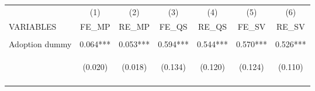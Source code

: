 \begin{center}
\begin{tabular}{lcccccc} \hline
 & (1) & (2) & (3) & (4) & (5) & (6) \\
VARIABLES & FE\_MP & RE\_MP & FE\_QS & RE\_QS & FE\_SV & RE\_SV \\ \hline
\vspace{4pt} & \begin{footnotesize}\end{footnotesize} & \begin{footnotesize}\end{footnotesize} & \begin{footnotesize}\end{footnotesize} & \begin{footnotesize}\end{footnotesize} & \begin{footnotesize}\end{footnotesize} & \begin{footnotesize}\end{footnotesize} \\
Adoption dummy & 0.064*** & 0.053*** & 0.594*** & 0.544*** & 0.570*** & 0.526*** \\
 & \begin{footnotesize}(0.020)\end{footnotesize} & \begin{footnotesize}(0.018)\end{footnotesize} & \begin{footnotesize}(0.134)\end{footnotesize} & \begin{footnotesize}(0.120)\end{footnotesize} & \begin{footnotesize}(0.124)\end{footnotesize} & \begin{footnotesize}(0.110)\end{footnotesize} \\
\vspace{4pt} & \begin{footnotesize}[0.001]\end{footnotesize} & \begin{footnotesize}[0.002]\end{footnotesize} & \begin{footnotesize}[0.000]\end{footnotesize} & \begin{footnotesize}[0.000]\end{footnotesize} & \begin{footnotesize}[0.000]\end{footnotesize} & \begin{footnotesize}[0.000]\end{footnotesize} \\

\end{tabular}
\end{center}
